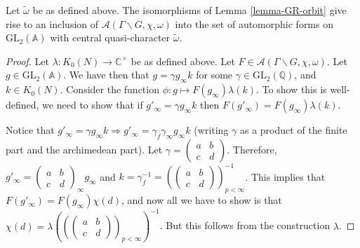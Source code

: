 \begin{proposition}
\label{proposition-classical-adelic-forms}
	Let $\tilde{\omega}$ be as defined above. The isomorphisms of Lemma \ref{lemma-GR-orbit} give rise to an inclusion of $\mathcal{A}(\Gamma \backslash G, \chi, \omega)$ into the set of automorphic forms on $\text{GL}_2(\mathbb{A})$ with central quasi-character $\tilde{\omega}$.
\end{proposition}

\begin{proof}
Let $\lambda: K_{0}(N) \to \mathbb{C}^{\times}$ be as defined above. Let $F \in \mathcal{A}(\Gamma \backslash G, \chi, \omega)$. 
Let $g \in \text{GL}_2(\mathbb{A})$. We have then that $g = \gamma g_{\infty} k$ for some $\gamma \in \text{GL}_2(\mathbb{Q})$, and $k \in K_0(N)$. Consider the function $\phi: g \mapsto F(g_{\infty})\lambda(k)$. To show this is well-defined, we need to show that if $g'_{\infty} = \gamma g_{\infty} k$ then $F(g'_{\infty}) = F(g_{\infty}) \lambda(k)$. 

Notice that $g'_{\infty} = \gamma g_{\infty} k \Rightarrow g'_{\infty} = \gamma_{f} \gamma_{\infty} g_{\infty} k $ (writing $\gamma$ as a product of the finite part and the archimedean part). Let $\gamma = \begin{pmatrix} a & b \\ c & d \end{pmatrix}$. Therefore, $g'_{\infty} = \begin{pmatrix} a & b \\ c & d \end{pmatrix}_{\infty} g_{\infty}$ and $k = \gamma_{f}^{-1} = (\begin{pmatrix} a & b \\ c & d \end{pmatrix})_{p < \infty}^{-1}$. This implies that $F(g'_{\infty}) = F(g_{\infty})\chi(d)$, and now all we have to show is that $\chi(d) = \lambda((\begin{pmatrix} a & b \\ c & d \end{pmatrix})_{p < \infty})^{-1}$. But this follows from the construction $\lambda$.


\end{proof}
